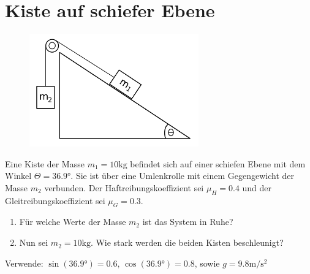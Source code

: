 \section{Kiste auf schiefer Ebene}
\begin{figure}
  \centering
  \includegraphics[width=0.65\textwidth]{aufg1.pdf}
  \label{fig: aufg1}
\end{figure}


Eine Kiste der Masse $m_1 = 10 \si{\kilo\gram}$ befindet sich auf einer schiefen Ebene mit dem Winkel $\Theta = 36.9\si{\degree}$.
Sie ist über eine Umlenkrolle mit einem Gegengewicht der Masse $m_2$ verbunden. Der Haftreibungskoeffizient sei $\mu_H = 0.4$ und
der Gleitreibungskoeffizient sei $\mu_G = 0.3$.
  \begin{enumerate}[label=\roman*]
    \item Für welche Werte der Masse $m_2$ ist das System in Ruhe?
    \item Nun sei $m_2 = 10\si{\kilo\gram}$. Wie stark werden die beiden Kisten beschleunigt?
  \end{enumerate}
Verwende: $\sin\left(36.9\si{\degree}\right) = 0.6,\, \cos\left(36.9\si{\degree}\right) = 0.8$, sowie $g = 9.8 \si{\meter \per \second^2}$

\newpage
